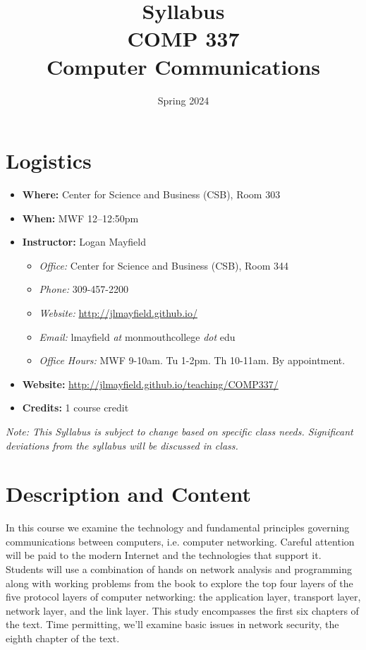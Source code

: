 \documentclass[10pt]{article}
\title{Syllabus \\ COMP 337 \\ Computer Communications}
\author{  }
\date{Spring 2024}
\begin{document}
\maketitle

\section{Logistics}
\begin{itemize}
\item \textbf{Where: }Center for Science and Business (CSB), Room 303
\item \textbf{When: } MWF 12--12:50pm
\item \textbf{Instructor: } Logan Mayfield
\begin{itemize}
\item \textit{Office: } Center for Science and Business (CSB), Room 344
\item \textit{Phone: } 309-457-2200 %
\item \textit{Website: } \url{http://jlmayfield.github.io/}
\item \textit{Email: } lmayfield \textit{at} monmouthcollege \textit{dot} edu
\item \textit{Office Hours: }  MWF 9-10am. Tu 1-2pm. Th 10-11am. By appointment.
\end{itemize}
\item \textbf{Website: } \url{http://jlmayfield.github.io/teaching/COMP337/}
\item \textbf{Credits: } 1 course credit
\end{itemize}
\emph{Note: This Syllabus is subject to change based on specific class needs. Significant deviations from the syllabus will be discussed in class.}



\section{Description and Content}

In this course we examine the technology and fundamental principles governing communications between computers, i.e. computer networking. Careful attention will be paid to the modern Internet and the technologies that support it.  Students will use a combination of hands on network analysis and programming along with working problems from the book to explore the top four layers of the five protocol layers of computer networking: the application layer, transport layer, network layer, and the link layer. This study encompasses the first six chapters of the text. Time permitting, we'll examine basic issues in network security, the eighth chapter of the text.
\end{document}
